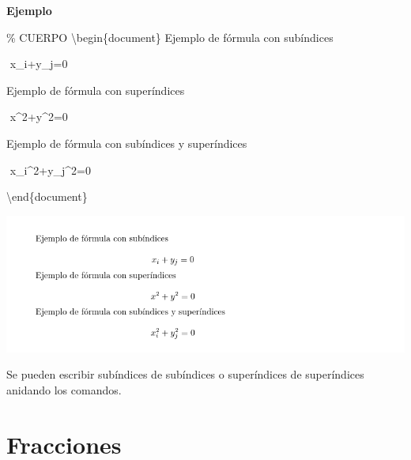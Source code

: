 \documentclass[
  letterpaper,
  DIV=11,
  numbers=noendperiod]{scrreport}
\newenvironment{Shaded}{\begin{snugshade}}{\end{snugshade}}
\newcommand{\CommentTok}[1]{\textcolor[rgb]{0.37,0.37,0.37}{#1}}
\newcommand{\ExtensionTok}[1]{\textcolor[rgb]{0.00,0.23,0.31}{#1}}
\newcommand{\KeywordTok}[1]{\textcolor[rgb]{0.00,0.23,0.31}{#1}}
\newcommand{\NormalTok}[1]{\textcolor[rgb]{0.00,0.23,0.31}{#1}}
\newcommand{\SpecialStringTok}[1]{\textcolor[rgb]{0.13,0.47,0.30}{#1}}
\begin{document}
\textbf{Ejemplo}

\begin{Shaded}
\begin{Highlighting}[]
\CommentTok{\% CUERPO}
\KeywordTok{\textbackslash{}begin}\NormalTok{\{}\ExtensionTok{document}\NormalTok{\}}
\NormalTok{Ejemplo de fórmula con subíndices}

\SpecialStringTok{$$ }
\SpecialStringTok{x\_i+y\_j=0}
\SpecialStringTok{$$}




\NormalTok{Ejemplo de fórmula con superíndices}

\SpecialStringTok{$$ }
\SpecialStringTok{x\^{}2+y\^{}2=0}
\SpecialStringTok{$$}




\NormalTok{Ejemplo de fórmula con subíndices y superíndices}

\SpecialStringTok{$$ }
\SpecialStringTok{x\_i\^{}2+y\_j\^{}2=0}
\SpecialStringTok{$$}




\KeywordTok{\textbackslash{}end}\NormalTok{\{}\ExtensionTok{document}\NormalTok{\}}
\end{Highlighting}
\end{Shaded}

\begin{tcolorbox}[enhanced jigsaw, opacitybacktitle=0.6, coltitle=black, colbacktitle=quarto-callout-note-color!10!white, title={Salida}, colback=white, toprule=.15mm, breakable, opacityback=0, left=2mm, rightrule=.15mm, toptitle=1mm, colframe=quarto-callout-note-color-frame, bottomtitle=1mm, titlerule=0mm, arc=.35mm, bottomrule=.15mm, leftrule=.75mm]
\includegraphics{./img/formulas/indices.png}
\end{tcolorbox}

Se pueden escribir subíndices de subíndices o superíndices de
superíndices anidando los comandos.

\hypertarget{fracciones}{%
\section{Fracciones}\label{fracciones}}
\end{document}
